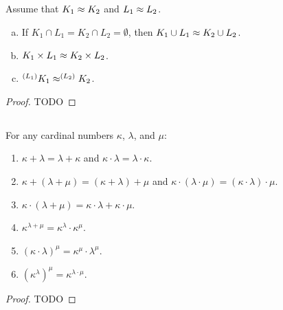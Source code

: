 \documentclass{report}
\begin{document}
\subsection{}%

  Assume that $K_1 \approx K_2$ and $L_1 \approx L_2$.
    \begin{enumerate}[(a)]
      \item If $K_1 \cap L_1 = K_2 \cap L_2 = \emptyset$, then
        $K_1 \cup L_1 \approx K_2 \cup L_2$.
      \item $K_1 \times L_1 \approx K_2 \times L_2$.
      \item $^{(L_1)}{K_1} \approx ^{(L_2)}{K_2}$.
    \end{enumerate}

  \begin{proof}
    TODO
  \end{proof}

\subsection{}%

  For any cardinal numbers $\kappa$, $\lambda$, and $\mu$:
    \begin{enumerate}
      \item $\kappa + \lambda = \lambda + \kappa$ and
        $\kappa \cdot \lambda = \lambda \cdot \kappa$.
      \item $\kappa + (\lambda + \mu) = (\kappa + \lambda) + \mu$ and
        $\kappa \cdot (\lambda \cdot \mu) = (\kappa \cdot \lambda) \cdot \mu$.
      \item $\kappa \cdot (\lambda + \mu) =
        \kappa \cdot \lambda + \kappa \cdot \mu$.
      \item $\kappa^{\lambda + \mu} = \kappa^\lambda \cdot \kappa^\mu$.
      \item $(\kappa \cdot \lambda)^\mu = \kappa^\mu \cdot \lambda^\mu$.
      \item $(\kappa^\lambda)^\mu = \kappa^{\lambda \cdot \mu}$.
    \end{enumerate}

  \begin{proof}
    TODO
  \end{proof}

\subsection{}%
\end{document}
